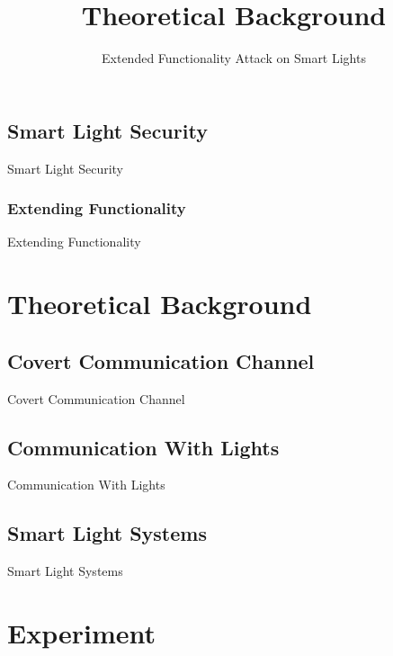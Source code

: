 \documentclass[11pt,t,usepdftitle=false,aspectratio=169]{beamer}
\begin{document}
\subsection{Smart Light Security} %
\label{sub:smart_light_security}
\begin{frame}{Smart Light Security}

\end{frame}

\subsubsection{Extending Functionality} %
\label{subsub:extending}
\begin{frame}{Extending Functionality}
	
\end{frame}


\section{Theoretical Background} %
\label{sec:theory}
\title{Theoretical Background}
\subtitle{Extended Functionality Attack on Smart Lights}

\subsection{Covert Communication Channel} %
\label{sub:covert_channel}
\begin{frame}{Covert Communication Channel}

\end{frame}

\subsection{Communication With Lights} %
\label{sub:light_communication}
\begin{frame}{Communication With Lights}

\end{frame}

\subsection{Smart Light Systems} %
\label{sub:smart_lights}
\begin{frame}{Smart Light Systems}
  
\end{frame}

\section{Experiment}%
\label{sec:results}
\end{document}
